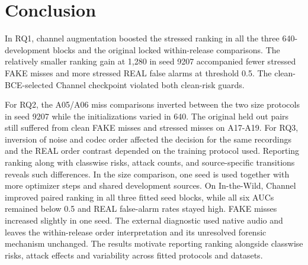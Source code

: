 \section{Conclusion}

In RQ1, channel augmentation boosted the stressed ranking in all the three 640-development blocks and the original locked within-release comparisons. The relatively smaller ranking gain at 1,280 in seed 9207 accompanied fewer stressed FAKE misses and more stressed REAL false alarms at threshold 0.5. The clean-BCE-selected Channel checkpoint violated both clean-risk guards.

For RQ2, the A05/A06 miss comparisons inverted between the two size protocols in seed 9207 while the initializations varied in 640. The original held out pairs still suffered from clean FAKE misses and stressed misses on A17-A19. For RQ3, inversion of noise and codec order affected the decision for the same recordings and the REAL order contrast depended on the training protocol used. Reporting ranking along with classwise risks, attack counts, and source-specific transitions reveals such differences. In the size comparison, one seed is used together with more optimizer steps and shared development sources. On In-the-Wild, Channel improved paired ranking in all three fitted seed blocks, while all six AUCs remained below 0.5 and REAL false-alarm rates stayed high. FAKE misses increased slightly in one seed. The external diagnostic used native audio and leaves the within-release order interpretation and its unresolved forensic mechanism unchanged. The results motivate reporting ranking alongside classwise risks, attack effects and variability across fitted protocols and datasets.
